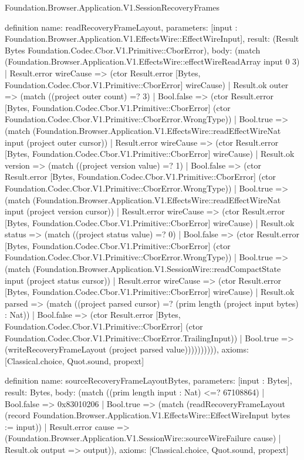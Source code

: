 \begin{lexlean}{Foundation.Browser.Application.V1.SessionRecoveryFrames}
\begin{semanticmodule}
definition{
  name: readRecoveryFrameLayout,
  parameters: [input : Foundation.Browser.Application.V1.EffectsWire::EffectWireInput],
  result: (Result Bytes Foundation.Codec.Cbor.V1.Primitive::CborError),
  body: (match (Foundation.Browser.Application.V1.EffectsWire::effectWireReadArray input 0 3)
    | Result.error wireCause => (ctor Result.error [Bytes, Foundation.Codec.Cbor.V1.Primitive::CborError] wireCause)
    | Result.ok outer => (match ((project outer count) =? 3)
      | Bool.false => (ctor Result.error [Bytes, Foundation.Codec.Cbor.V1.Primitive::CborError] (ctor Foundation.Codec.Cbor.V1.Primitive::CborError.WrongType))
      | Bool.true => (match (Foundation.Browser.Application.V1.EffectsWire::readEffectWireNat input (project outer cursor))
        | Result.error wireCause => (ctor Result.error [Bytes, Foundation.Codec.Cbor.V1.Primitive::CborError] wireCause)
        | Result.ok version => (match ((project version value) =? 1)
          | Bool.false => (ctor Result.error [Bytes, Foundation.Codec.Cbor.V1.Primitive::CborError] (ctor Foundation.Codec.Cbor.V1.Primitive::CborError.WrongType))
          | Bool.true => (match (Foundation.Browser.Application.V1.EffectsWire::readEffectWireNat input (project version cursor))
            | Result.error wireCause => (ctor Result.error [Bytes, Foundation.Codec.Cbor.V1.Primitive::CborError] wireCause)
            | Result.ok status => (match ((project status value) =? 0)
              | Bool.false => (ctor Result.error [Bytes, Foundation.Codec.Cbor.V1.Primitive::CborError] (ctor Foundation.Codec.Cbor.V1.Primitive::CborError.WrongType))
              | Bool.true => (match (Foundation.Browser.Application.V1.SessionWire::readCompactState input (project status cursor))
                | Result.error wireCause => (ctor Result.error [Bytes, Foundation.Codec.Cbor.V1.Primitive::CborError] wireCause)
                | Result.ok parsed => (match ((project parsed cursor) =? (prim length (project input bytes) : Nat))
                  | Bool.false => (ctor Result.error [Bytes, Foundation.Codec.Cbor.V1.Primitive::CborError] (ctor Foundation.Codec.Cbor.V1.Primitive::CborError.TrailingInput))
                  | Bool.true => (writeRecoveryFrameLayout (project parsed value)))))))))),
  axioms: [Classical.choice, Quot.sound, propext]
}

definition{
  name: sourceRecoveryFrameLayoutBytes,
  parameters: [input : Bytes],
  result: Bytes,
  body: (match ((prim length input : Nat) <=? 67108864)
    | Bool.false => 0x83010206
    | Bool.true => (match (readRecoveryFrameLayout (record Foundation.Browser.Application.V1.EffectsWire::EffectWireInput {bytes := input}))
      | Result.error cause => (Foundation.Browser.Application.V1.SessionWire::sourceWireFailure cause)
      | Result.ok output => output)),
  axioms: [Classical.choice, Quot.sound, propext]
}


\end{semanticmodule}
\end{lexlean}
